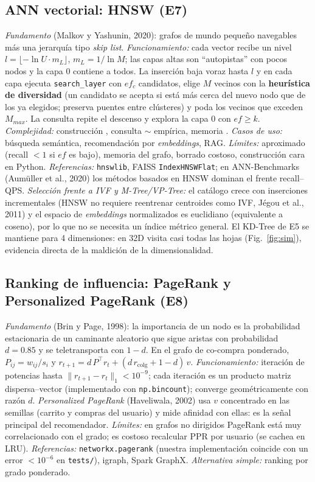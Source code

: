 \subsection{ANN vectorial: HNSW (E7)}
\emph{Fundamento} (Malkov y Yashunin, 2020): grafos de mundo pequeño navegables más una jerarquía tipo \emph{skip list}. \emph{Funcionamiento:} cada
vector recibe un nivel $l=\lfloor-\ln U\cdot m_L\rfloor$, $m_L=1/\ln M$; las capas altas son “autopistas” con pocos nodos y la capa 0 contiene a todos.
La inserción baja voraz hasta $l$ y en cada capa ejecuta \texttt{search\_layer} con $ef_c$ candidatos, elige $M$ vecinos con la \textbf{heurística de
diversidad} (un candidato se acepta si está más cerca del nuevo nodo que de los ya elegidos; preserva puentes entre clústeres) y poda los vecinos que
exceden $M_{max}$. La consulta repite el descenso y explora la capa 0 con $ef\ge k$. \emph{Complejidad:} construcción , consulta
$\sim$ empírica, memoria . \emph{Casos de uso:} búsqueda semántica, recomendación por \emph{embeddings}, RAG.
\emph{Límites:} aproximado (recall $<1$ si $ef$ es bajo), memoria del grafo, borrado costoso, construcción cara en Python.
\emph{Referencias:} \texttt{hnswlib}, FAISS \texttt{IndexHNSWFlat}; en ANN-Benchmarks (Aumüller et al., 2020) los métodos basados en HNSW dominan el frente
recall–QPS. \emph{Selección frente a IVF y M-Tree/VP-Tree:} el catálogo crece con inserciones incrementales (HNSW no requiere reentrenar centroides como IVF,
Jégou et al., 2011) y el espacio de \emph{embeddings} normalizados es euclidiano (equivalente a coseno), por lo que no se necesita un índice métrico general.
El KD-Tree de E5 se mantiene para 4 dimensiones: en 32D visita casi todas las hojas (Fig.~\ref{fig:sim}), evidencia directa de la maldición de la dimensionalidad.

\subsection{Ranking de influencia: PageRank y Personalized PageRank (E8)}
\emph{Fundamento} (Brin y Page, 1998): la importancia de un nodo es la probabilidad estacionaria de un caminante aleatorio que sigue aristas con probabilidad
$d=0.85$ y se teletransporta con $1-d$. En el grafo de co-compra ponderado, $P_{ij}=w_{ij}/s_i$ y $r_{t+1}=d\,P^\top r_t+(d\,r_{\text{colg}}+1-d)\,v$.
\emph{Funcionamiento:} iteración de potencias hasta $\|r_{t+1}-r_t\|_1<10^{-9}$; cada iteración es un producto matriz dispersa–vector  (implementado con
\texttt{np.bincount}); converge geométricamente con razón $d$. \emph{Personalized PageRank} (Haveliwala, 2002) usa $v$ concentrado en las semillas (carrito y
compras del usuario) y mide afinidad con ellas: es la señal principal del recomendador. \emph{Límites:} en grafos no dirigidos PageRank está muy
correlacionado con el grado; es costoso recalcular PPR por usuario (se cachea en LRU). \emph{Referencias:} \texttt{networkx.pagerank} (nuestra
implementación coincide con un error $<10^{-6}$ en \texttt{tests/}), igraph, Spark GraphX. \emph{Alternativa simple:} ranking por grado ponderado.

